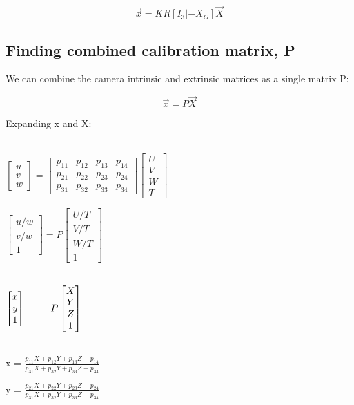 \documentclass[a4paper]{article}
\begin{document}
\begin{equation}
\vec{x}= KR [I_{3}| - X_{O}]\vec{X}
\label{eq1}
\end{equation}
\subsection{Finding combined calibration matrix, P}
We can combine the camera intrinsic and extrinsic matrices as a single matrix P:

\begin{equation}
\vec{x}= P \vec{X}
\label{eq2}
\end{equation}

Expanding x and X:
\begin{center}
\\$ \begin{bmatrix} u\\ v\\ w \end{bmatrix}   =   \begin{bmatrix}p_{11} & p_{12} & p_{13} & p_{14}\\ p_{21} & p_{22} & p_{23} & p_{24}\\ p_{31} & p_{32} & p_{33} & p_{34}\end{bmatrix} \begin{bmatrix} U\\ V\\ W\\ T \end{bmatrix} $

$ \begin{bmatrix} u/w\\ v/w\\ 1 \end{bmatrix}  = P  \begin{bmatrix} U/T\\ V/T\\ W/T\\ 1 \end{bmatrix} $

\\$ \begin{bmatrix} x\\ y\\ 1 \end{bmatrix}  =  \hspace{5mm} P  \begin{bmatrix}X\\ Y\\ Z\\ 1 \end{bmatrix} $

\\x = \(\frac{p_{11}X + p_{12}Y + p_{13}Z + p_{14}}{p_{31}X + p_{32}Y + p_{33}Z + p_{34}}\)

y = \(\frac{p_{21}X + p_{22}Y + p_{23}Z + p_{24}}{p_{31}X + p_{32}Y + p_{33}Z + p_{34}}\)

\end{center}
\end{document}
